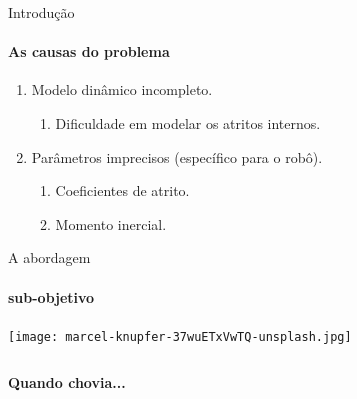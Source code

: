 \begin{frame}[t]{Introdução}
  \framesubtitle{As causas do problema}
  \transdissolve[duration=0.5]
  \begin{enumerate}
    \item Modelo dinâmico incompleto.
    \begin{enumerate}
      \item Dificuldade em modelar os atritos internos.
    \end{enumerate}

    \item Parâmetros imprecisos (específico para o robô).
    \begin{enumerate}
      \item Coeficientes de atrito.
      \item Momento inercial.
    \end{enumerate}
  \end{enumerate}

\end{frame}
\begin{frame}[c]{A abordagem}
  \framesubtitle{sub-objetivo}
  \transdissolve[duration=0.5]



\end{frame}
{
  {\texttt{[image: marcel-knupfer-37wuETxVwTQ-unsplash.jpg]}}
  \begin{frame}[c]{}
    \transboxout[duration=0.5]

    \begin{columns}
      \vspace*{-3.5cm}
      \Huge{\textbf{\textcolor{mracula5}{Quando chovia...}}}
    \end{columns}
  \end{frame}
}

